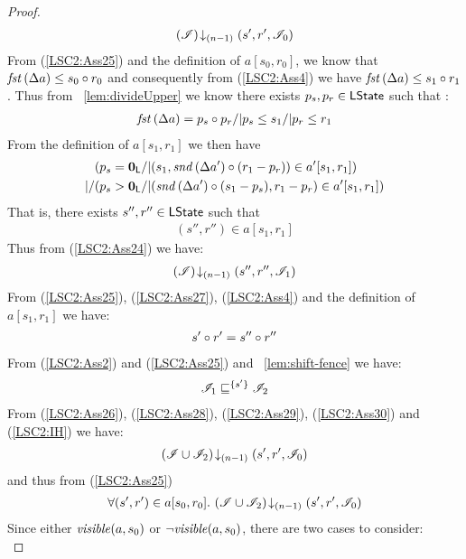 \begin{lemma}
\begin{proof}
%
\begin{align}
	\left(\mathscr{I}\right) \!\downarrow_{(n-1)} \left(s', r', \mathscr{I}_0\right)
	\label{LSC2:Ass26}
\end{align}
From (\ref{LSC2:Ass25}) and the definition of $a[s_0, r_0]$, we know that $\mathit{fst}\left(\Delta {a}\right) \leq s_0 \circ r_0$ and consequently from (\ref{LSC2:Ass4}) we have $\mathit{fst}\left(\Delta {a}\right) \leq s_1 \circ r_1$. Thus from \lem~\ref{lem:divideUpper} we know there exists $p_s, p_r \in \textsf{LState}$ such that : 
%
\begin{align*}
	\mathit{fst}\left(\Delta {a}\right) = p_s \circ p_r /| p_s \leq s_1 /| p_r \leq r_1
\end{align*}
%
From the definition of $a[s_1, r_1]$ we then have
%
\begin{align*}
	& (p_s = \mathbf{0}_{\textsf{L}} /| (s_1, \mathit{snd}\left(\Delta {a'}\right) \circ (r_1 -p_r)) \in a'[s_1, r_1])\\
	|/ & (p_s > \mathbf{0}_{\textsf{L}} /| (\mathit{snd}\left(\Delta {a'}\right) \circ (s_1 - p_s), r_1 - p_r) \in a'[s_1, r_1]) 
\end{align*}
That is, there exists $s'', r'' \in \textsf{LState}$ such that
%
\begin{align}
	(s'', r'') \in a[s_1, r_1]
	\label{LSC2:Ass27}
\end{align}
%
Thus from (\ref{LSC2:Ass24}) we have:
%
\begin{align}
	\left(\mathscr{I}\right) \!\downarrow_{(n-1)} \left(s'', r'', \mathscr{I}_1\right)
	\label{LSC2:Ass28}
\end{align}
%
From (\ref{LSC2:Ass25}), (\ref{LSC2:Ass27}), (\ref{LSC2:Ass4}) and the definition of $a[s_1, r_1]$ we have:
%
\begin{align}
	s' \circ r' = s'' \circ r'' 
	\label{LSC2:Ass29}
\end{align}
%
From (\ref{LSC2:Ass2}) and (\ref{LSC2:Ass25}) and \lem~\ref{lem:shift-fence} we have:
%
\begin{align}
	\mathscr{I}_1 \sqsubseteq^{\{s'\}} \mathscr{I}_2 
	\label{LSC2:Ass30}
\end{align}
%
From (\ref{LSC2:Ass26}), (\ref{LSC2:Ass28}), (\ref{LSC2:Ass29}), (\ref{LSC2:Ass30}) and (\ref{LSC2:IH}) we have: 
%
\begin{align*}
	\left(\mathscr{I} \cup \mathscr{I}_2\right) \!\downarrow_{(n-1)} \left(s', r', \mathscr{I}_0\right)
\end{align*}
%
and thus from (\ref{LSC2:Ass25}) 
%
\begin{align}
	\forall (s', r') \in a[s_0, r_0].\, \left(\mathscr{I} \cup \mathscr{I}_2\right) \!\downarrow_{(n-1)} \left(s', r', \mathscr{I}_0\right)
	\label{LSC2:Ass31}
\end{align}
%
Since either $\mathit{visible}(a, s_0)$ or $\neg\mathit{visible}(a, s_0)$, there are two cases to consider:\\


\end{proof}
\end{lemma}
